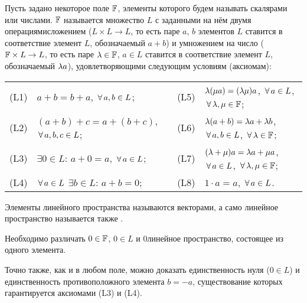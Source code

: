 \documentclass[a4paper,12pt,fleqn]{article}
\begin{document}

Пусть задано некоторое поле $\mathbb{F}$, элементы которого будем называть  скалярами или  числами.  $\mathbb{F}$ называется множество $L$ с заданными на нём двумя операциями\т сложением ($L\times L\to L$, то есть паре $a$, $b$ элементов $L$ ставится в соответствие элемент $L$, обозначаемый $a+b$) и умножением на число ($\mathbb{F}\times L\rightarrow L$, то есть паре $\lambda\in \mathbb{F}$, $a\in L$ ставится в соответствие элемент $L$, обозначаемый $\lambda a$), удовлетворяющими следующим условиям (аксиомам):

\begin{tabular}{llll}
(L1) & $a+b=b+a$, $\,\forall\, a,b\in L$; & (L5) & $\lambda(\mu a)=(\lambda \mu)a$, $\,\forall\, a\in L$, $\,\forall\, \lambda,\mu\in\mathbb{F}$; \\
(L2) & $(a+b)+c=a+(b+c)$, $\,\forall\, a,b, c\in L$; & (L6) & $\lambda(a+b)=\lambda a+\lambda b$, $\,\forall\, a,b\in L$, $\,\forall\, \lambda\in\mathbb{F}$; \\
(L3) & $\exi 0\in L$: $a+0=a$, $\,\forall\, a\in L$; & (L7) & $(\lambda+\mu)a=\lambda a+\mu a$, $\,\forall\, a\in L$, $\,\forall\, \lambda,\mu\in\mathbb{F}$; \\
(L4) & $\,\forall\, a\in L$ $\exi b\in L$: $a+b=0$; & (L8) & $1\cdot a=a$, $\,\forall\, a\in L$. \\
\end{tabular}

Элементы линейного пространства называются  векторами, а само линейное пространство называется также .

Необходимо различать $0\in \mathbb{F}$, $0\in L$ и $0$\т линейное пространство, состоящее из одного элемента.

Точно также, как и в любом поле, можно доказать единственность нуля ($0\in L$) и единственность противоположного элемента $b=-a$, существование которых гарантируется аксиомами (L3) и (L4).
\end{document}
